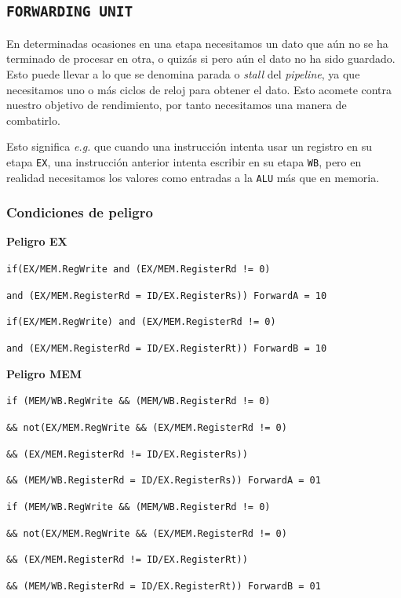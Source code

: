 \documentclass[a4paper]{article}
\begin{document}
\subsection{\texttt{FORWARDING UNIT}} \label{sec:fu}
En determinadas ocasiones en una etapa necesitamos un dato que aún no se ha terminado de procesar en otra, o quizás si pero aún el dato no ha sido guardado. Esto puede llevar a lo que se denomina parada o \textit{stall} del \textit{pipeline}, ya que necesitamos uno o más ciclos de reloj para obtener el dato. Esto acomete contra nuestro objetivo de rendimiento, por tanto necesitamos una manera de combatirlo.

Esto significa \textit{e.g.} que cuando una instrucción intenta usar un registro en su etapa \texttt{EX}, una instrucción anterior intenta escribir en su etapa \texttt{WB}, pero en realidad necesitamos los valores como entradas a la \texttt{ALU} más que en memoria.

\subsubsection{Condiciones de peligro}

\textbf{Peligro EX}

\texttt{if(EX/MEM.RegWrite and (EX/MEM.RegisterRd != 0)}

\texttt{and (EX/MEM.RegisterRd = ID/EX.RegisterRs)) ForwardA = 10}

\texttt{if(EX/MEM.RegWrite) and (EX/MEM.RegisterRd != 0)}

\texttt{and (EX/MEM.RegisterRd = ID/EX.RegisterRt)) ForwardB = 10}

\medskip

\textbf{Peligro MEM}

\texttt{if (MEM/WB.RegWrite \&\& (MEM/WB.RegisterRd !=  0)}

\texttt{\&& not(EX/MEM.RegWrite \&& (EX/MEM.RegisterRd != 0)}

\texttt{\&& (EX/MEM.RegisterRd != ID/EX.RegisterRs))}

\texttt{\&& (MEM/WB.RegisterRd = ID/EX.RegisterRs)) ForwardA = 01}

\texttt{if (MEM/WB.RegWrite \&& (MEM/WB.RegisterRd !=  0)}

\texttt{\&& not(EX/MEM.RegWrite \&& (EX/MEM.RegisterRd !=  0)}

\texttt{\&& (EX/MEM.RegisterRd !=  ID/EX.RegisterRt))}

\texttt{\&&  (MEM/WB.RegisterRd = ID/EX.RegisterRt)) ForwardB = 01}
\end{document}
